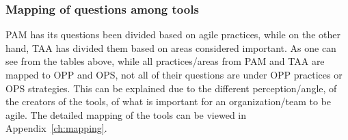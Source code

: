 \subsubsection{Mapping of questions among tools}
\label{subsubsec:mapping}

\ac{PAM} has its questions been divided based on agile practices, while on the other hand, \ac{TAA} has divided them based on areas considered important. As one can see from the tables above, while all practices/areas from \ac{PAM} and \ac{TAA} are mapped to \ac{OPP} and \ac{OPS}, not all of their questions are under \ac{OPP} practices or \ac{OPS} strategies. This can be explained due to the different perception/angle, of the creators of the tools, of what is important for an organization/team to be agile. The detailed mapping of the tools can be viewed in Appendix~\ref{ch:mapping}.


%

